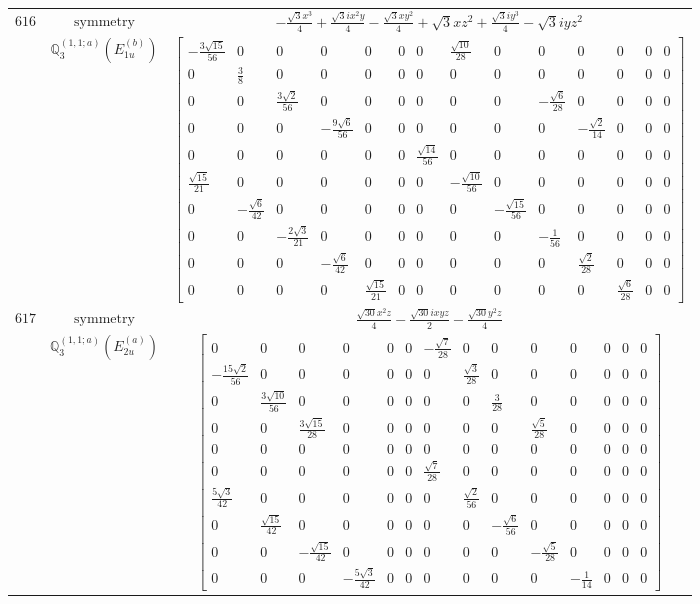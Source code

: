 \documentclass[fleqn,8pt,landscape]{jsarticle}
\begin{document}
\begin{longtable}{ccc}
$ 616 $ & $ \text{symmetry} $ & $ - \frac{\sqrt{3} x^{3}}{4} + \frac{\sqrt{3} i x^{2} y}{4} - \frac{\sqrt{3} x y^{2}}{4} + \sqrt{3} x z^{2} + \frac{\sqrt{3} i y^{3}}{4} - \sqrt{3} i y z^{2} $ \\
$  $ & $ \mathbb{Q}_{3}^{(1,1;a)}(E_{1u}^{(b)}) $ & $ \begin{bmatrix} - \frac{3 \sqrt{15}}{56} & 0 & 0 & 0 & 0 & 0 & 0 & \frac{\sqrt{10}}{28} & 0 & 0 & 0 & 0 & 0 & 0 \\ 0 & \frac{3}{8} & 0 & 0 & 0 & 0 & 0 & 0 & 0 & 0 & 0 & 0 & 0 & 0 \\ 0 & 0 & \frac{3 \sqrt{2}}{56} & 0 & 0 & 0 & 0 & 0 & 0 & - \frac{\sqrt{6}}{28} & 0 & 0 & 0 & 0 \\ 0 & 0 & 0 & - \frac{9 \sqrt{6}}{56} & 0 & 0 & 0 & 0 & 0 & 0 & - \frac{\sqrt{2}}{14} & 0 & 0 & 0 \\ 0 & 0 & 0 & 0 & 0 & 0 & \frac{\sqrt{14}}{56} & 0 & 0 & 0 & 0 & 0 & 0 & 0 \\ \frac{\sqrt{15}}{21} & 0 & 0 & 0 & 0 & 0 & 0 & - \frac{\sqrt{10}}{56} & 0 & 0 & 0 & 0 & 0 & 0 \\ 0 & - \frac{\sqrt{6}}{42} & 0 & 0 & 0 & 0 & 0 & 0 & - \frac{\sqrt{15}}{56} & 0 & 0 & 0 & 0 & 0 \\ 0 & 0 & - \frac{2 \sqrt{3}}{21} & 0 & 0 & 0 & 0 & 0 & 0 & - \frac{1}{56} & 0 & 0 & 0 & 0 \\ 0 & 0 & 0 & - \frac{\sqrt{6}}{42} & 0 & 0 & 0 & 0 & 0 & 0 & \frac{\sqrt{2}}{28} & 0 & 0 & 0 \\ 0 & 0 & 0 & 0 & \frac{\sqrt{15}}{21} & 0 & 0 & 0 & 0 & 0 & 0 & \frac{\sqrt{6}}{28} & 0 & 0 \end{bmatrix} $ \\ \hline
$ 617 $ & $ \text{symmetry} $ & $ \frac{\sqrt{30} x^{2} z}{4} - \frac{\sqrt{30} i x y z}{2} - \frac{\sqrt{30} y^{2} z}{4} $ \\
$  $ & $ \mathbb{Q}_{3}^{(1,1;a)}(E_{2u}^{(a)}) $ & $ \begin{bmatrix} 0 & 0 & 0 & 0 & 0 & 0 & - \frac{\sqrt{7}}{28} & 0 & 0 & 0 & 0 & 0 & 0 & 0 \\ - \frac{15 \sqrt{2}}{56} & 0 & 0 & 0 & 0 & 0 & 0 & \frac{\sqrt{3}}{28} & 0 & 0 & 0 & 0 & 0 & 0 \\ 0 & \frac{3 \sqrt{10}}{56} & 0 & 0 & 0 & 0 & 0 & 0 & \frac{3}{28} & 0 & 0 & 0 & 0 & 0 \\ 0 & 0 & \frac{3 \sqrt{15}}{28} & 0 & 0 & 0 & 0 & 0 & 0 & \frac{\sqrt{5}}{28} & 0 & 0 & 0 & 0 \\ 0 & 0 & 0 & 0 & 0 & 0 & 0 & 0 & 0 & 0 & 0 & 0 & 0 & 0 \\ 0 & 0 & 0 & 0 & 0 & 0 & \frac{\sqrt{7}}{28} & 0 & 0 & 0 & 0 & 0 & 0 & 0 \\ \frac{5 \sqrt{3}}{42} & 0 & 0 & 0 & 0 & 0 & 0 & \frac{\sqrt{2}}{56} & 0 & 0 & 0 & 0 & 0 & 0 \\ 0 & \frac{\sqrt{15}}{42} & 0 & 0 & 0 & 0 & 0 & 0 & - \frac{\sqrt{6}}{56} & 0 & 0 & 0 & 0 & 0 \\ 0 & 0 & - \frac{\sqrt{15}}{42} & 0 & 0 & 0 & 0 & 0 & 0 & - \frac{\sqrt{5}}{28} & 0 & 0 & 0 & 0 \\ 0 & 0 & 0 & - \frac{5 \sqrt{3}}{42} & 0 & 0 & 0 & 0 & 0 & 0 & - \frac{1}{14} & 0 & 0 & 0 \end{bmatrix} $ \\ \hline

\end{longtable}
\end{document}
